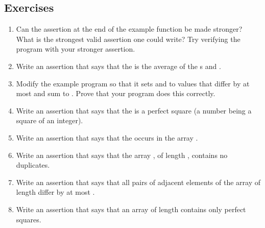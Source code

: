%

\subsection*{Exercises}
\begin{enumerate}
\item Can the assertion at the end of the example function be made
  stronger? What is the strongest valid assertion one could write? Try 
  verifying the program with your stronger assertion.
\item Write an assertion that says that the   is the average of
  the s  and .
\item Modify the example program so that it sets  and  to values
that differ by at most  and sum to . Prove that your program 
does this correctly.
\item Write an assertion that says that the   is a
  perfect square (\ie a number being a square of an integer).
\item Write an assertion that says that the   occurs
  in the  array .
\item Write an assertion that says that the  array ,
  of length , contains no duplicates.
\item Write an assertion that says that all pairs of adjacent elements
  of the  array  of length  differ by at most
  .
\item Write an assertion that says that an array  of length
   contains only perfect squares.
\end{enumerate}

